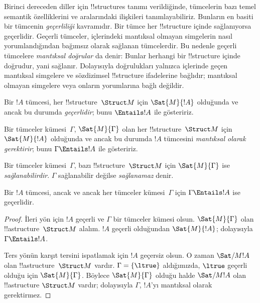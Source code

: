 \documentclass[../../../include/open-logic-section]{subfiles}
\begin{document}

\begin{explain}
Birinci dereceden diller için !!{structure}s tanımı verildiğinde,
tümcelerin bazı temel semantik özelliklerini ve aralarındaki ilişkileri
tanımlayabiliriz. Bunların en basiti bir tümcenin \emph{geçerliliği}
kavramıdır. Bir tümce her !!{structure} içinde sağlanıyorsa geçerlidir.
Geçerli tümceler, içlerindeki mantıksal olmayan simgelerin nasıl
yorumlandığından bağımsız olarak sağlanan tümcelerdir. Bu nedenle
geçerli tümcelere \emph{mantıksal doğrular} da denir: Bunlar herhangi
bir !!{structure} içinde doğrudur, yani sağlanır. Dolayısıyla
doğrulukları yalnızca içlerinde geçen mantıksal simgelere ve
sözdizimsel !!{structure} ifadelerine bağlıdır; mantıksal olmayan
simgelere veya onların yorumlarına bağlı değildir.
\end{explain}

\begin{defn}[Geçerlilik]
Bir $!A$ tümcesi, her !!{structure}~$\Struct M$ için $\Sat{M}{!A}$
olduğunda ve ancak bu durumda \emph{geçerlidir}; bunu $\Entails !A$
ile gösteririz.
\end{defn}

\begin{defn}
Bir tümceler kümesi~$\Gamma$, $\Sat{M}{\Gamma}$ olan her
!!{structure}~$\Struct M$ için $\Sat{M}{!A}$ olduğunda ve ancak bu
durumda $!A$ tümcesini \emph{mantıksal olarak gerektirir}; bunu
$\Gamma\Entails !A$ ile gösteririz.
\end{defn}

\begin{defn}[Sağlanabilirlik]
Bir tümceler kümesi~$\Gamma$, bazı !!{structure}~$\Struct M$ için
$\Sat{M}{\Gamma}$ ise \emph{sağlanabilirdir}. $\Gamma$ sağlanabilir
değilse \emph{sağlanamaz} denir.
\end{defn}

\begin{prop}
Bir $!A$ tümcesi, ancak ve ancak her tümceler kümesi~$\Gamma$ için
$\Gamma\Entails !A$ ise geçerlidir.
\end{prop}

\begin{proof}
İleri yön için $!A$ geçerli ve $\Gamma$ bir tümceler kümesi olsun.
$\Sat{M}{\Gamma}$ olan !!a{structure}~$\Struct M$ alalım. $!A$ geçerli
olduğundan $\Sat{M}{!A}$; dolayısıyla $\Gamma\Entails !A$.

Ters yönün karşıt tersini ispatlamak için $!A$ geçersiz olsun. O zaman
$\Sat/{M}{!A}$ olan !!a{structure}~$\Struct M$ vardır. $\Gamma=\{\ltrue\}$
aldığımızda, $\ltrue$ geçerli olduğu için $\Sat{M}{\Gamma}$. Böylece
$\Sat{M}{\Gamma}$ olduğu halde $\Sat/{M}{!A}$ olan !!a{structure}
$\Struct M$ vardır; dolayısıyla $\Gamma$, $!A$'yı mantıksal olarak
gerektirmez.
\end{proof}
\end{document}
